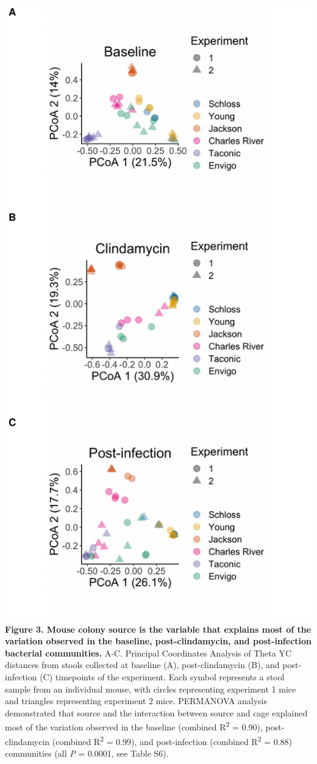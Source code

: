 \documentclass[11pt,]{article}
\begin{document}
\includegraphics{figure_3.pdf} \textbf{Figure 3. Mouse colony source is
the variable that explains most of the variation observed in the
baseline, post-clindamycin, and post-infection bacterial communities.}
A-C. Principal Coordinates Analysis of Theta YC distances from stools
collected at baseline (A), post-clindamycin (B), and post-infection (C)
timepoints of the experiment. Each symbol represents a stool sample from
an individual mouse, with circles representing experiment 1 mice and
triangles representing experiment 2 mice. PERMANOVA analysis
demonstrated that source and the interaction between source and cage
explained most of the variation observed in the baseline (combined
R\textsuperscript{2} = 0.90), post-clindamycin (combined
R\textsuperscript{2} = 0.99), and post-infection (combined
R\textsuperscript{2} = 0.88) communities (all \emph{P} = 0.0001, see
Table S6).
\end{document}
